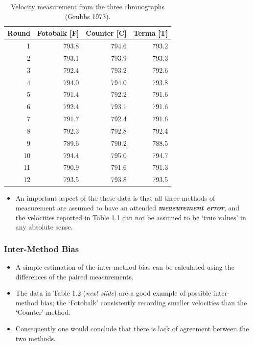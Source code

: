 \documentclass[compress]{beamer}        %
\begin{document}
\begin{frame}
\large

\begin{table}[ht]
\begin{center}
\begin{tabular}{rrrr}
  \hline
  Round& Fotobalk [F] & Counter [C]& Terma [T]\\
  \hline
  1 & 793.8 & 794.6 & 793.2 \\
  2 & 793.1 & 793.9 & 793.3 \\
  3 & 792.4 & 793.2 & 792.6 \\
  4 & 794.0 & 794.0 & 793.8 \\
  5 & 791.4 & 792.2 & 791.6 \\
  6 & 792.4 & 793.1 & 791.6 \\
  7 & 791.7 & 792.4 & 791.6 \\
  8 & 792.3 & 792.8 & 792.4 \\
  9 & 789.6 & 790.2 & 788.5 \\
  10 & 794.4 & 795.0 & 794.7 \\
  11 & 790.9 & 791.6 & 791.3 \\
  12 & 793.5 & 793.8 & 793.5 \\
   \hline
\end{tabular}
\caption{Velocity measurement from the three chronographs (Grubbs
1973).}
\end{center}
\end{table}
\end{frame}
\begin{frame}
\large
\begin{itemize}
\item An important aspect of the these data is that all three methods of
measurement are assumed to have an attended \textbf{\textit{measurement error}}, and
the velocities reported in Table 1.1 can not be assumed to be
`true values' in any absolute sense.
\end{itemize}


\end{frame}
\begin{frame}
\frametitle{Inter-Method Bias}
\large
\begin{itemize}
\item 
A simple estimation of the
inter-method bias can be calculated using the differences of the
paired measurements. \item The data in Table 1.2 (\textit{next slide}) are a good example of
possible inter-method bias; the `Fotobalk' consistently recording
smaller velocities than the `Counter' method.
\item Consequently one
would conclude that there is lack of agreement between the two
methods.
\end{itemize}
\end{frame}
\end{document}
